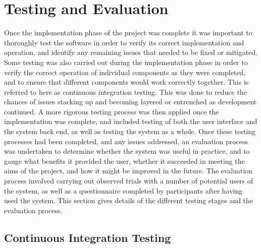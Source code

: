 
\chapter[Testing and Evaluation]{Testing and Evaluation} %

\label{Chapter10} %


Once the implementation phase of the project was complete it was important to thoroughly test the software in order to verify its correct implementation and operation, and identify any remaining issues that needed to be fixed or mitigated. Some testing was also carried out during the implementation phase in order to verify the correct operation of individual components as they were completed, and to ensure that different components would work correctly together. This is referred to here as continuous integration testing. This was done to reduce the chances of issues stacking up and becoming layered or entrenched as development continued. A more rigorous testing process was then applied once the implementation was complete, and included testing of both the user interface and the system back end, as well as testing the system as a whole. Once these testing processes had been completed, and any issues addressed, an evaluation process was undertaken to determine whether the system was useful in practice, and to gauge what benefits it provided the user, whether it succeeded in meeting the aims of the project, and how it might be improved in the future. The evaluation process involved carrying out observed trials with a number of potential users of the system, as well as a questionnaire completed by participants after having used the system. This section gives details of the different testing stages and the evaluation process.


\section{Continuous Integration Testing} \label{ContinuousIntegrationTesting}



